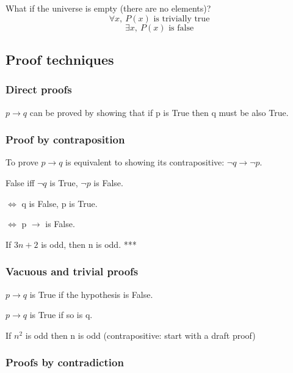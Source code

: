 \documentclass[12pt, a4paper]{book}
\begin{document}
\begin{rem}
    What if the universe is empty (there are no elements)?
    $$\forall x, \ P(x) \text{ is trivially true}$$
    $$\exists x, \ P(x) \text{ is false}$$
\end{rem}

\subsection*{Proof techniques}
\subsubsection*{Direct proofs}
$p \rightarrow q$ can be proved by showing that if p is True then q must be also True.

\begin{exmp}
\end{exmp}

\subsubsection*{Proof by contraposition}
To prove $p \rightarrow q$ is equivalent to showing its contrapositive: $\lnot q \rightarrow \lnot p$.

False iff $\lnot q$ is True, $\lnot p$ is False.

$\Leftrightarrow$ q is False, p is True.

$\Leftrightarrow$ p $\rightarrow$ is False.

\begin{exmp}
    If $3n+2$ is odd, then n is odd.
    ***
\end{exmp}

\subsubsection*{Vacuous and trivial proofs}
$p \rightarrow q$ is True if the hypothesis is False.

$p \rightarrow q$ is True if so is q.

\begin{exmp}
    If $n^2$ is odd then n is odd (contrapositive: start with a draft proof)
\end{exmp}

\subsubsection*{Proofs by contradiction}
\end{document}
